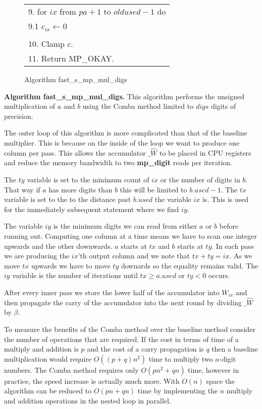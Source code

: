 \documentclass[b5paper]{book}
\begin{document}
\begin{figure}[!here]
\begin{small}
\begin{center}
\begin{tabular}{l}
9.  for $ix$ from $pa + 1$ to $oldused - 1$ do \\
\hspace{3mm}9.1 $c_{ix} \leftarrow 0$ \\
\\
10.  Clamp $c$. \\
11.  Return MP\_OKAY. \\
\hline
\end{tabular}
\end{center}
\end{small}
\caption{Algorithm fast\_s\_mp\_mul\_digs}
\label{fig:COMBAMULT}
\end{figure}

\textbf{Algorithm fast\_s\_mp\_mul\_digs.}
This algorithm performs the unsigned multiplication of $a$ and $b$ using the Comba method limited to $digs$ digits of precision.

The outer loop of this algorithm is more complicated than that of the baseline multiplier.  This is because on the inside of the 
loop we want to produce one column per pass.  This allows the accumulator $\_ \hat W$ to be placed in CPU registers and
reduce the memory bandwidth to two \textbf{mp\_digit} reads per iteration.

The $ty$ variable is set to the minimum count of $ix$ or the number of digits in $b$.  That way if $a$ has more digits than
$b$ this will be limited to $b.used - 1$.  The $tx$ variable is set to the to the distance past $b.used$ the variable
$ix$ is.  This is used for the immediately subsequent statement where we find $iy$.  

The variable $iy$ is the minimum digits we can read from either $a$ or $b$ before running out.  Computing one column at a time
means we have to scan one integer upwards and the other downwards.  $a$ starts at $tx$ and $b$ starts at $ty$.  In each
pass we are producing the $ix$'th output column and we note that $tx + ty = ix$.  As we move $tx$ upwards we have to 
move $ty$ downards so the equality remains valid.  The $iy$ variable is the number of iterations until 
$tx \ge a.used$ or $ty < 0$ occurs.

After every inner pass we store the lower half of the accumulator into $W_{ix}$ and then propagate the carry of the accumulator
into the next round by dividing $\_ \hat W$ by $\beta$.

To measure the benefits of the Comba method over the baseline method consider the number of operations that are required.  If the 
cost in terms of time of a multiply and addition is $p$ and the cost of a carry propagation is $q$ then a baseline multiplication would require 
$O \left ((p + q)n^2 \right )$ time to multiply two $n$-digit numbers.  The Comba method requires only $O(pn^2 + qn)$ time, however in practice, 
the speed increase is actually much more.  With $O(n)$ space the algorithm can be reduced to $O(pn + qn)$ time by implementing the $n$ multiply
and addition operations in the nested loop in parallel.  
\end{document}
